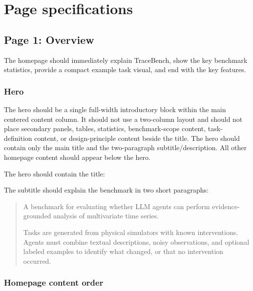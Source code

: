 \documentclass[11pt]{article}
\begin{document}
\section*{Page specifications}
\label{sec:website-page-overview}
\subsection*{Page 1: Overview}
The homepage should immediately explain TraceBench, show the key benchmark statistics, provide a compact example task visual, and end with the key features.

\subsubsection*{Hero}

The hero should be a single full-width introductory block within the main centered content column.
It should not use a two-column layout and should not place secondary panels, tables, statistics, benchmark-scope content, task-definition content, or design-principle content beside the title.
The hero should contain only the main title and the two-paragraph subtitle/description.
All other homepage content should appear below the hero.

The hero should contain the title:

\begin{quote}
\end{quote}

The subtitle should explain the benchmark in two short paragraphs:

\begin{quote}
A benchmark for evaluating whether LLM agents can perform evidence-grounded analysis of multivariate time series.

Tasks are generated from physical simulators with known interventions.
Agents must combine textual descriptions, noisy observations, and optional labeled examples to identify what changed, or that no intervention occurred.
\end{quote}


\subsubsection*{Homepage content order}
\end{document}
